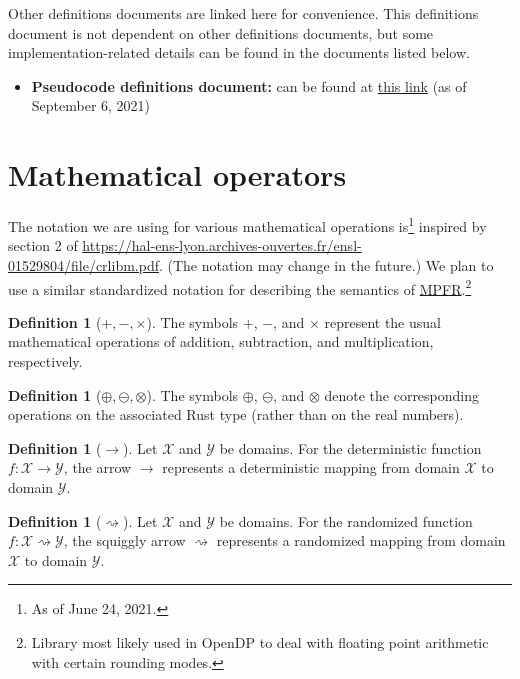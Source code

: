 \documentclass[11pt,a4paper]{article}
\theoremstyle{definition}
\newtheorem{definition}[theorem]{Definition}
\begin{document}
Other definitions documents are linked here for convenience. This definitions document is not dependent on other definitions documents, but some implementation-related details can be found in the documents listed below.

\begin{itemize}
    \item \textbf{Pseudocode definitions document:} can be found at \href{https://raw.githubusercontent.com/opendp/whitepapers/pseudocode-defns/pseudocode-defns/pseudocode_defns.pdf}{this link} (as of September 6, 2021)
\end{itemize}

\section{Mathematical operators}
The notation we are using for various mathematical operations is\footnote{As of June 24, 2021.} inspired by section 2 of \url{https://hal-ens-lyon.archives-ouvertes.fr/ensl-01529804/file/crlibm.pdf}. (The notation may change in the future.) We plan to use a similar standardized notation for describing the semantics of \href{https://www.mpfr.org/}{MPFR}.\footnote{Library most likely used in OpenDP to deal with floating point arithmetic with certain rounding modes.}

\begin{definition}[$+, -, \times$]
    The symbols $+$, $-$, and $\times$ represent the usual mathematical operations of addition, subtraction, and multiplication, respectively.
\end{definition}

\begin{definition}[$\oplus, \ominus, \otimes$]
    The symbols $\oplus$, $\ominus$, and $\otimes$ denote the corresponding operations on the associated Rust type (rather than on the real numbers).
\end{definition}

\begin{definition}[$\rightarrow$]
    Let $\mathcal{X}$ and $\mathcal{Y}$ be domains. For the deterministic function $f:\mathcal{X}\rightarrow\mathcal{Y}$, the arrow $\rightarrow$ represents a deterministic mapping from domain $\mathcal{X}$ to domain $\mathcal{Y}$.
\end{definition}

\begin{definition}[$\rightsquigarrow$]
    Let $\mathcal{X}$ and $\mathcal{Y}$ be domains. For the randomized function $f:\mathcal{X}\rightsquigarrow\mathcal{Y}$, the squiggly arrow $\rightsquigarrow$ represents a randomized mapping from domain $\mathcal{X}$ to domain $\mathcal{Y}$.
\end{definition}
\end{document}
